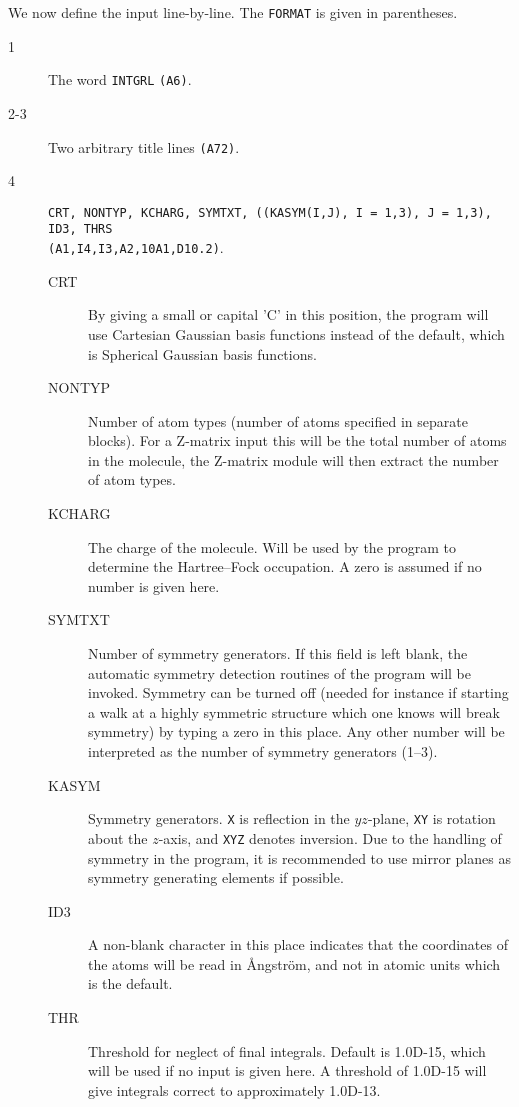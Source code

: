 We now define the input line-by-line.  The {\tt FORMAT} is given
in parentheses.
\begin{description}
\item[1] The word \verb|INTGRL| {\tt (A6)}.
\item[2-3] Two arbitrary title lines {\tt (A72)}.
\item[4]
\verb|CRT, NONTYP, KCHARG, SYMTXT, ((KASYM(I,J), I = 1,3), J = 1,3), ID3, THRS|
\\ \verb|(A1,I4,I3,A2,10A1,D10.2)|.
\begin{description}
\item[CRT] By giving a small or capital 'C' in this
position, the program will use Cartesian Gaussian basis
functions
instead of the default, which is Spherical Gaussian basis
functions.
\item[NONTYP] Number of atom types (number of atoms specified
in separate blocks). For a Z-matrix input this will be the total
number of atoms in the molecule, the Z-matrix module will then
extract the number of atom types.
\item[KCHARG] The charge of the molecule.
Will be used  by the program to determine the Hartree--Fock
occupation. A zero
is assumed if no number is given here.
\item[SYMTXT] Number of symmetry generators.
If this field is
left blank, the automatic symmetry detection
routines of the program will be
invoked. Symmetry can be turned off (needed for instance if starting a
walk at a highly symmetric structure which one knows will break
symmetry) by typing a zero in this place. Any other number will be
interpreted as the number of symmetry generators (1--3).
\item[KASYM] Symmetry generators.  {\tt X}
is reflection
in the \mbox{$yz$-plane}, {\tt XY} is rotation about
the \mbox{$z$-axis},
and {\tt XYZ} denotes inversion. Due to the handling
of symmetry in
the program, it is recommended to use mirror planes as symmetry
generating elements if possible.

\item[ID3] A non-blank character in this place indicates that the
coordinates of the atoms will be read in
{\AA}ngstr\"{o}m, and not in
atomic units which is the default.
\item[THR] Threshold for neglect of final integrals. Default
is 1.0D-15, which will be used if no input is given here. A threshold
of 1.0D-15 will give integrals correct to approximately 1.0D-13.
\end{description}
\end{description}

